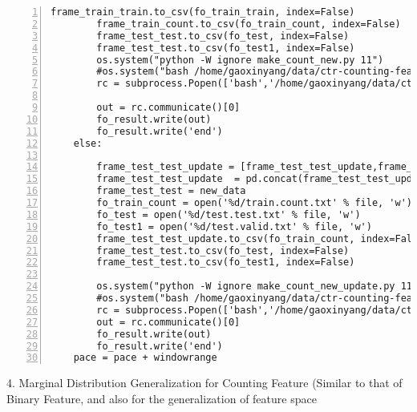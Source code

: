 \begin{lstlisting}[numbers=left, breaklines=true]
        frame_train_train.to_csv(fo_train_train, index=False)
        frame_train_count.to_csv(fo_train_count, index=False)
        frame_test_test.to_csv(fo_test, index=False)
        frame_test_test.to_csv(fo_test1, index=False)
        os.system("python -W ignore make_count_new.py 11")
        #os.system("bash /home/gaoxinyang/data/ctr-counting-features/models/lr/lr-driver_count.sh")
        rc = subprocess.Popen(['bash','/home/gaoxinyang/data/ctr-counting-features/models/lr/lr-driver_count.sh'],stdout=subprocess.PIPE)

        out = rc.communicate()[0]
        fo_result.write(out)
        fo_result.write('end')
    else:
        
        frame_test_test_update = [frame_test_test_update,frame_test_test]
        frame_test_test_update  = pd.concat(frame_test_test_update)
        frame_test_test = new_data
        fo_train_count = open('%d/train.count.txt' % file, 'w')
        fo_test = open('%d/test.test.txt' % file, 'w')
        fo_test1 = open('%d/test.valid.txt' % file, 'w')
        frame_test_test_update.to_csv(fo_train_count, index=False)
        frame_test_test.to_csv(fo_test, index=False)
        frame_test_test.to_csv(fo_test1, index=False)
        
        os.system("python -W ignore make_count_new_update.py 11")
        #os.system("bash /home/gaoxinyang/data/ctr-counting-features/models/lr/lr-driver_count_update.sh")
        rc = subprocess.Popen(['bash','/home/gaoxinyang/data/ctr-counting-features/models/lr/lr-driver_count_update.sh'],stdout=subprocess.PIPE)
        out = rc.communicate()[0]
        fo_result.write(out)
        fo_result.write('end')
    pace = pace + windowrange
\end{lstlisting}
4. Marginal Distribution Generalization for Counting Feature (Similar to that of Binary Feature, and also for the generalization of feature space
